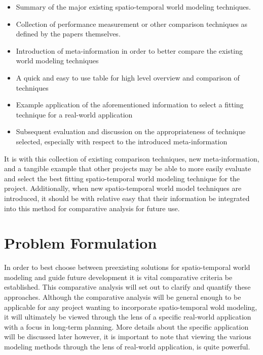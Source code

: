 \begin{itemize}
  \item Summary of the major existing spatio-temporal world modeling techniques.

  \item Collection of performance measurement or other comparison techniques as
    defined by the papers themselves.

  \item Introduction of meta-information in order to better compare the existing
    world modeling techniques

  \item A quick and easy to use table for high level overview and comparison of techniques

  \item Example application of the aforementioned information to select a fitting
    technique for a real-world application

  \item Subsequent evaluation and discussion on the appropriateness of technique
    selected, especially with respect to the introduced meta-information

\end{itemize}

It is with this collection of existing comparison techniques, new meta-information,
and a tangible example that other projects may be able to more easily evaluate
and select the best fitting spatio-temporal world modeling technique for the
project. Additionally, when new spatio-temporal world model techniques are
introduced, it should be with relative easy that their information be integrated
into this method for comparative analysis for future use.



\section{ Problem Formulation }

In order to best choose between preexisting solutions for spatio-temporal
world modeling and guide future development it is vital comparative criteria be
established. This comparative analysis will set out to clarify and quantify
these approaches. Although the comparative analysis will be general enough to be
applicable for any project wanting to incorporate spatio-temporal wold modeling,
it will ultimately be viewed through the lens of a specific real-world application
with a focus in long-term planning. More details about the specific application
will be discussed later however, it is important to note that viewing the
various modeling methods through the lens of real-world application, is quite
powerful. \\


